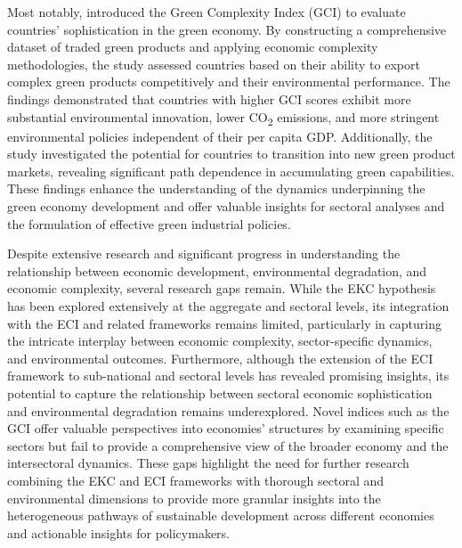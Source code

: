 \documentclass[10pt]{article}
\begin{document}
Most notably, \cite{mealyEconomicComplexityGreen2022} introduced the Green Complexity Index (GCI) to evaluate countries' sophistication in the green economy. By constructing a comprehensive dataset of traded green products and applying economic complexity methodologies, the study assessed countries based on their ability to export complex green products competitively and their environmental performance. The findings demonstrated that countries with higher GCI scores exhibit more substantial environmental innovation, lower CO\textsubscript{2} emissions, and more stringent environmental policies independent of their per capita GDP. Additionally, the study investigated the potential for countries to transition into new green product markets, revealing significant path dependence in accumulating green capabilities. These findings enhance the understanding of the dynamics underpinning the green economy development and offer valuable insights for sectoral analyses and the formulation of effective green industrial policies.

Despite extensive research and significant progress in understanding the relationship between economic development, environmental degradation, and economic complexity, several research gaps remain. While the EKC hypothesis has been explored extensively at the aggregate and sectoral levels, its integration with the ECI and related frameworks remains limited, particularly in capturing the intricate interplay between economic complexity, sector-specific dynamics, and environmental outcomes. Furthermore, although the extension of the ECI framework to sub-national and sectoral levels has revealed promising insights, its potential to capture the relationship between sectoral economic sophistication and environmental degradation remains underexplored. Novel indices such as the GCI offer valuable perspectives into economies' structures by examining specific sectors but fail to provide a comprehensive view of the broader economy and the intersectoral dynamics. These gaps highlight the need for further research combining the EKC and ECI frameworks with thorough sectoral and environmental dimensions to provide more granular insights into the heterogeneous pathways of sustainable development across different economies and actionable insights for policymakers.
\end{document}
